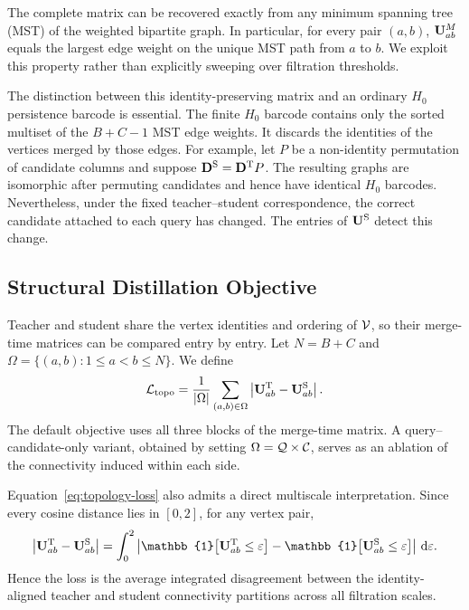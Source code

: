 The complete matrix can be recovered exactly from any minimum spanning tree
(MST) of the weighted bipartite graph. In particular, for every pair $(a,b)$,
$\mathbf{U}^{M}_{ab}$ equals the largest edge weight on the unique MST path from
$a$ to $b$. We exploit this property rather than explicitly sweeping over
filtration thresholds.

The distinction between this identity-preserving matrix and an ordinary $H_0$
persistence barcode is essential. The finite $H_0$ barcode contains only the
sorted multiset of the $B+C-1$ MST edge weights. It discards the identities of
the vertices merged by those edges. For example, let $P$ be a non-identity
permutation of candidate columns and suppose
$\mathbf{D}^{\mathrm{S}}=\mathbf{D}^{\mathrm{T}}P$. The resulting graphs are
isomorphic after permuting candidates and hence have identical $H_0$
barcodes. Nevertheless, under the fixed teacher--student correspondence, the
correct candidate attached to each query has changed. The entries of
$\mathbf{U}^{\mathrm{S}}$ detect this change.

\subsection{Structural Distillation Objective}
\label{sec:method-objective}

Teacher and student share the vertex identities and ordering of $\mathcal{V}$,
so their merge-time matrices can be compared entry by entry. Let
$N=B+C$ and $\Omega=\{(a,b):1\leq a<b\leq N\}$. We define
\begin{equation}
    \mathcal{L}_{\mathrm{topo}}
    = \frac{1}{|\Omega|}
      \sum_{(a,b)\in\Omega}
      \left|
        \mathbf{U}^{\mathrm{T}}_{ab}
        - \mathbf{U}^{\mathrm{S}}_{ab}
      \right|.
    \label{eq:topology-loss}
\end{equation}
The default objective uses all three blocks of the merge-time matrix. A
query--candidate-only variant, obtained by setting
$\Omega=\mathcal{Q}\times\mathcal{C}$, serves as an ablation of the connectivity
induced within each side.

Equation~\eqref{eq:topology-loss} also admits a direct multiscale
interpretation. Since every cosine distance lies in $[0,2]$, for any vertex
pair,
\begin{equation}
    \left|\mergemat^{\teacher}_{ab}-\mergemat^{\student}_{ab}\right|
    = \int_{0}^{2}
      \left|
      \mathbb{1}\!\left[\mergemat^{\teacher}_{ab}\leq\varepsilon\right]
      -
      \mathbb{1}\!\left[\mergemat^{\student}_{ab}\leq\varepsilon\right]
      \right|\,\mathrm{d}\varepsilon.
    \label{eq:multiscale-interpretation}
\end{equation}
Hence the loss is the average integrated disagreement between the
identity-aligned teacher and student connectivity partitions across all
filtration scales.

